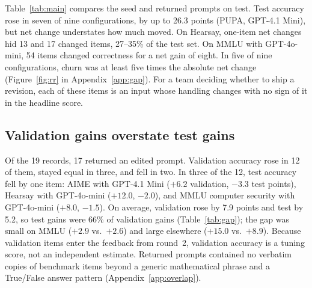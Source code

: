 \documentclass[11pt]{article}
\begin{document}
Table~\ref{tab:main} compares the seed and returned prompts on test. Test accuracy rose in seven of nine configurations, by up to 26.3 points (PUPA, GPT-4.1 Mini), but net change understates how much moved. On Hearsay, one-item net changes hid 13 and 17 changed items, 27--35\% of the test set. On MMLU with GPT-4o-mini, 54 items changed correctness for a net gain of eight. In five of nine configurations, churn was at least five times the absolute net change (Figure~\ref{fig:rr} in Appendix~\ref{app:gap}). For a team deciding whether to ship a revision, each of these items is an input whose handling changes with no sign of it in the headline score.

\subsection{Validation gains overstate test gains}
\label{sec:valtest}

\begin{table}[!t]
\centering
\small
{}
\caption{Mean validation and test changes (points) for the 17 runs that returned an edited prompt; the other two retained the seed. Runs are weighted equally. The fourth column counts runs whose validation accuracy rose while test accuracy fell.}
\label{tab:gap}
\end{table}

Of the 19 records, 17 returned an edited prompt. Validation accuracy rose in 12 of them, stayed equal in three, and fell in two. In three of the 12, test accuracy fell by one item: AIME with GPT-4.1 Mini ($+6.2$ validation, $-3.3$ test points), Hearsay with GPT-4o-mini ($+12.0$, $-2.0$), and MMLU computer security with GPT-4o-mini ($+8.0$, $-1.5$). On average, validation rose by 7.9 points and test by 5.2, so test gains were 66\% of validation gains (Table~\ref{tab:gap}); the gap was small on MMLU ($+2.9$ vs.\ $+2.6$) and large elsewhere ($+15.0$ vs.\ $+8.9$). Because validation items enter the feedback from round~2, validation accuracy is a tuning score, not an independent estimate. Returned prompts contained no verbatim copies of benchmark items beyond a generic mathematical phrase and a True/False answer pattern (Appendix~\ref{app:overlap}).
\end{document}
